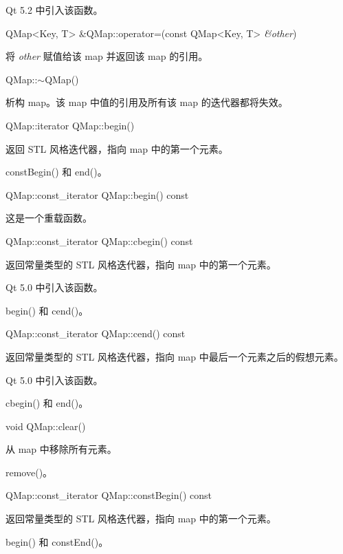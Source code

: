 Qt 5.2 中引入该函数。

\splitLine

QMap<Key, T> \&QMap::operator=(const QMap<Key, T> \emph{\&other})

将 \emph{other} 赋值给该 map 并返回该 map 的引用。

QMap::$\sim$QMap()

析构 map。该 map 中值的引用及所有该 map 的迭代器都将失效。

\splitLine

QMap::iterator QMap::begin()

返回 STL 风格迭代器，指向 map 中的第一个元素。

\begin{seeAlso}
constBegin() 和 end()。
\end{seeAlso}

\splitLine

QMap::const\_iterator QMap::begin() const

这是一个重载函数。

\splitLine

QMap::const\_iterator QMap::cbegin() const

返回常量类型的 STL 风格迭代器，指向 map 中的第一个元素。

Qt 5.0 中引入该函数。

\begin{seeAlso}
begin() 和 cend()。
\end{seeAlso}

\splitLine

QMap::const\_iterator QMap::cend() const

返回常量类型的 STL 风格迭代器，指向 map 中最后一个元素之后的假想元素。

Qt 5.0 中引入该函数。

\begin{seeAlso}
cbegin() 和 end()。
\end{seeAlso}

\splitLine

void QMap::clear()

从 map 中移除所有元素。

\begin{seeAlso}
remove()。
\end{seeAlso}

\splitLine

QMap::const\_iterator QMap::constBegin() const

返回常量类型的 STL 风格迭代器，指向 map 中的第一个元素。

\begin{seeAlso}
begin() 和 constEnd()。
\end{seeAlso}

